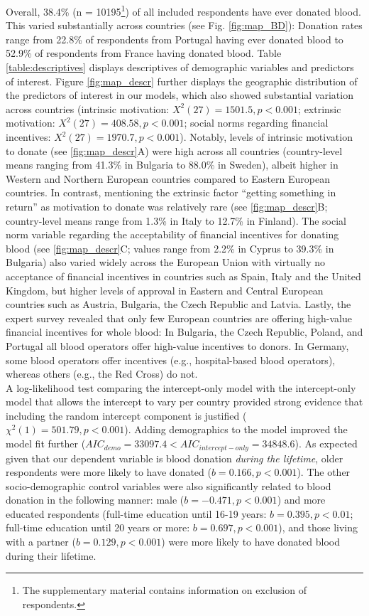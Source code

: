 \documentclass[AER]{AEA}
\begin{document}
Overall, 38.4\% (n = 10195\footnote{The supplementary material contains information on exclusion of respondents.}) of all included respondents have ever donated blood. This varied substantially across countries (see Fig. \ref{fig:map_BD}): Donation rates range from 22.8\% of respondents from Portugal having ever donated blood to 52.9\% of respondents from France having donated blood. Table \ref{table:descriptives} displays descriptives of demographic variables and predictors of interest. Figure \ref{fig:map_descr} further displays the geographic distribution of the predictors of interest in our models, which also showed substantial variation across countries (intrinsic motivation: ${X}^2(27) = 1501.5, p < 0.001$; extrinsic motivation: ${X}^2(27)= 408.58, p < 0.001$; social norms regarding financial incentives: ${X}^2(27) = 1970.7, p < 0.001$). Notably, levels of intrinsic motivation to donate (see \ref{fig:map_descr}A) were high across all countries (country-level means ranging from 41.3\% in Bulgaria to 88.0\% in Sweden), albeit higher in Western and Northern European countries compared to Eastern European countries. In contrast, mentioning the extrinsic factor “getting something in return” as motivation to donate was relatively rare (see \ref{fig:map_descr}B; country-level means range from 1.3\% in Italy to 12.7\% in Finland). The social norm variable regarding the acceptability of financial incentives for donating blood (see \ref{fig:map_descr}C; values range from 2.2\% in Cyprus to 39.3\% in Bulgaria) also varied widely across the European Union with virtually no acceptance of financial incentives in countries such as Spain, Italy and the United Kingdom, but higher levels of approval in Eastern and Central European countries such as Austria, Bulgaria, the Czech Republic and Latvia. Lastly, the expert survey revealed that only few European countries are offering high-value financial incentives for whole blood: In Bulgaria, the Czech Republic, Poland, and Portugal all blood operators offer high-value incentives to donors. In Germany, some blood operators offer incentives (e.g., hospital-based blood operators), whereas others (e.g., the Red Cross) do not.
\\

A log-likelihood test comparing the intercept-only model with the intercept-only model that allows the intercept to vary per country provided strong evidence that including the random intercept component is justified (${\chi}^2(1)=501.79, p < 0.001$). Adding demographics to the model improved the model fit further ($AIC_{demo} = 33097.4 < AIC_{intercept-only} = 34848.6$). As expected given that our dependent variable is blood donation \textit{during the lifetime}, older respondents were more likely to have donated ($b = 0.166, p < 0.001$). The other socio-demographic control variables were also significantly related to blood donation in the following manner: male ($b = -0.471, p < 0.001$) and more educated respondents (full-time education until 16-19 years: $b = 0.395, p < 0.01$; full-time education until 20 years or more: $b = 0.697, p < 0.001$), and those living with a partner ($b = 0.129, p < 0.001$) were more likely to have donated blood during their lifetime.
\end{document}
